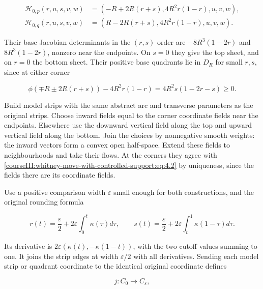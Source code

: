 \begin{equation}
\begin{aligned}
\mathcal H_{0,p}(r,u,s,v,w)
 &=(-R+2R(r+s),4R^2r(1-r),u,v,w),\\
\mathcal H_{0,q}(r,u,s,v,w)
 &=(R-2R(r+s),4R^2r(1-r),u,v,w).
\end{aligned}
\label{courseIII:whitney-move-with-controlled-support:eq:4.2}
\end{equation}

Their base Jacobian determinants in the \((r,s)\) order are \(-8R^3(1-2r)\) and \(8R^3(1-2r)\), nonzero near the endpoints. On \(s=0\) they give the top sheet, and on \(r=0\) the bottom sheet. Their positive base quadrants lie in \(D_R\) for small \(r,s\), since at either corner

\begin{equation}
\phi(\mp R\pm2R(r+s))-4R^2r(1-r)
=4R^2s(1-2r-s)\geq0.
\label{courseIII:whitney-move-with-controlled-support:eq:4.3}
\end{equation}

Build model strips with the same abstract arc and transverse parameters as the original strips. Choose inward fields equal to the corner coordinate fields near the endpoints. Elsewhere use the downward vertical field along the top and upward vertical field along the bottom. Join the choices by nonnegative smooth weights: the inward vectors form a convex open half-space. Extend these fields to neighbourhoods and take their flows. At the corners they agree with \eqref{courseIII:whitney-move-with-controlled-support:eq:4.2} by uniqueness, since the fields there are its coordinate fields.

Use a positive comparison width \(\varepsilon\) small enough for both constructions, and the original rounding formula

\begin{equation}
r(t)=\frac{\varepsilon}{2}+2\varepsilon\int_0^t\kappa(\tau)d\tau,
\qquad
s(t)=\frac{\varepsilon}{2}+2\varepsilon\int_t^1\kappa(1-\tau)d\tau.
\label{courseIII:whitney-move-with-controlled-support:eq:4.4}
\end{equation}

Its derivative is \(2\varepsilon(\kappa(t),-\kappa(1-t))\), with the two cutoff values summing to one. It joins the strip edges at width \(\varepsilon/2\) with all derivatives. Sending each model strip or quadrant coordinate to the identical original coordinate defines

\begin{equation}
j:C_0\longrightarrow C_\varepsilon,
\label{courseIII:whitney-move-with-controlled-support:eq:4.5}
\end{equation}

